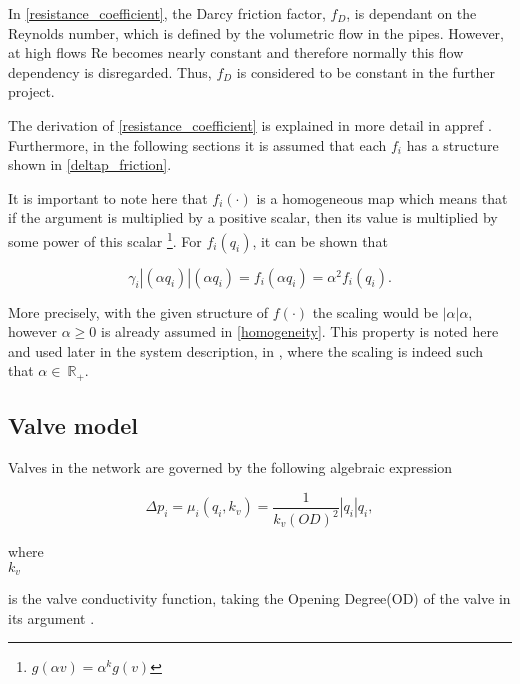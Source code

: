 In \eqref{resistance_coefficient}, the Darcy friction factor, $f_D$, is dependant on the Reynolds number, which is defined by the volumetric flow in the pipes. However, at high flows Re becomes nearly constant and therefore normally this flow dependency is disregarded. Thus, $f_D$ is considered to be constant in the further project. 

The derivation of \eqref{resistance_coefficient} is explained in more detail in appref \cite{chen2016sustainable}. Furthermore, in the following sections it is assumed that each $f_i$ has a structure shown in \eqref{deltap_friction}.

It is important to note here that $f_i(\cdot)$ is a homogeneous map which means that if the argument is multiplied by a positive scalar, then its value is multiplied by some power of this scalar \footnote{$g(\alpha v) = \alpha^k g(v)$}. For $f_i(q_i)$, it can be shown that

\begin{equation}
  \label{homogeneity}
  \gamma_i |(\alpha q_i)|(\alpha q_i) = f_i(\alpha q_i) = \alpha^2 f_i(q_i).
\end{equation}

More precisely, with the given structure of $f(\cdot)$ the scaling would be $|\alpha|\alpha$, however $\alpha \geq 0$ is already assumed in \eqref{homogeneity}. 
This property is noted here and used later in the system description, in , where the scaling is indeed such that $\alpha \in \: \mathbb{R}_{+}$.

\subsection{Valve model}
\label{valve_component}

Valves in the network are governed by the following algebraic expression

\begin{equation}
\label{valvemodel}
 \Delta p_i = \mu_i(q_i,k_v) = \frac{1}{k_v(OD)^2} |q_i| q_i, 
\end{equation}

 \begin{minipage}[t]{0.20\textwidth}
where\\
\hspace*{8mm} $k_v$ 
\end{minipage}
\begin{minipage}[t]{0.68\textwidth}
\vspace*{2mm}
is the valve conductivity function, taking the Opening Degree(OD) of the valve in its argument \cite{8thsemester_project}.
\end{minipage}


